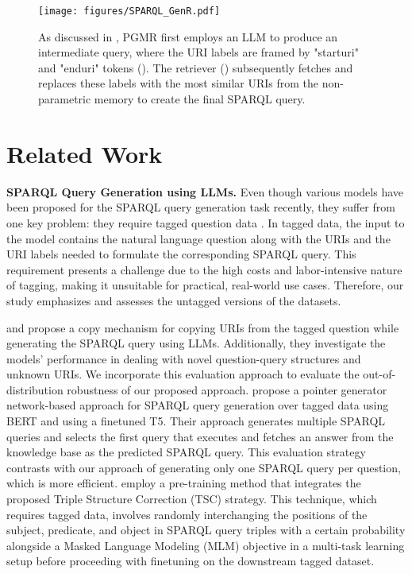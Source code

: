 
\begin{figure*}
     \centering
    \texttt{[image: figures/SPARQL\_GenR.pdf]}
    \caption{As discussed in , PGMR first employs an LLM to produce an intermediate query, where the URI labels are framed by "starturi" and "enduri" tokens (). The retriever () subsequently fetches and replaces these labels with the most similar URIs from the non-parametric memory to create the final SPARQL query.}
    \label{fig:rag_vs_model}
    \label{fig:genR}
\end{figure*}



\section{Related Work}
\label{sec:related_work}

\noindent \textbf{SPARQL Query Generation using LLMs.} Even though various models have been proposed for the SPARQL query generation task recently, they suffer from one key problem: they require tagged question data \citep{banerjee, reyd2023, karou2023, qi2024enhancing}. In tagged data, the input to the model contains the natural language question along with the URIs and the URI labels needed to formulate the corresponding SPARQL query. 
This requirement presents a challenge due to the high costs and labor-intensive nature of tagging, making it unsuitable for practical, real-world use cases. Therefore, our study emphasizes and assesses the untagged versions of the datasets.

\citet{reyd2023} and \citet{karou2023} propose a copy mechanism for copying URIs from the tagged question while generating the SPARQL query using LLMs. Additionally, they investigate the models' performance in dealing with novel question-query structures and unknown URIs. We incorporate this evaluation approach to evaluate the out-of-distribution robustness of our proposed approach.
\citet{banerjee} propose a pointer generator network-based approach for SPARQL query generation over tagged data using BERT \citep{bert} and using a finetuned T5. Their approach generates multiple SPARQL queries and selects the first query that executes and fetches an answer from the knowledge base as the predicted SPARQL query. This evaluation strategy contrasts with our approach of generating only one SPARQL query per question, which is more efficient. %
\citet{qi2024enhancing} employ a pre-training method that integrates the proposed Triple Structure Correction (TSC) strategy. This technique, which requires tagged data, involves randomly interchanging the positions of the subject, predicate, and object in SPARQL query triples with a certain probability alongside a Masked Language Modeling (MLM) objective in a multi-task learning setup before proceeding with finetuning on the downstream tagged dataset.

